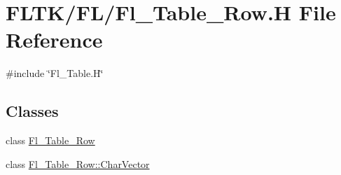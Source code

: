 \hypertarget{_fl___table___row_8_h}{}\section{F\+L\+T\+K/\+F\+L/\+Fl\+\_\+\+Table\+\_\+\+Row.H File Reference}
\label{_fl___table___row_8_h}
{\ttfamily \#include \char`\"{}Fl\+\_\+\+Table.\+H\char`\"{}}\newline
\subsection*{Classes}
\begin{DoxyCompactItemize}
\item 
class \hyperlink{class_fl___table___row}{Fl\+\_\+\+Table\+\_\+\+Row}
\item 
class \hyperlink{class_fl___table___row_1_1_char_vector}{Fl\+\_\+\+Table\+\_\+\+Row\+::\+Char\+Vector}
\end{DoxyCompactItemize}
